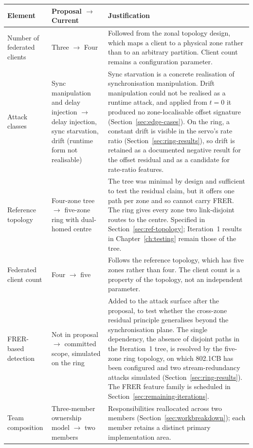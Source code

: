 \begin{longtable}{p{} p{} p{}}
\toprule
\textbf{Element} & \textbf{Proposal $\rightarrow$ Current} & \textbf{Justification} \\
\midrule
\endhead
Number of federated clients & Three $\rightarrow$ Four &
Followed from the zonal topology design, which maps a client to a physical zone
rather than to an arbitrary partition. Client count remains a configuration parameter. \\
\addlinespace
Attack classes & Sync manipulation and delay injection $\rightarrow$ delay injection,
sync starvation, drift (runtime form not realisable) &
Sync starvation is a concrete realisation of synchronisation manipulation. Drift
manipulation could not be realised as a runtime attack, and applied from $t=0$ it
produced no zone-localisable offset signature (Section~\ref{sec:edge-cases}). On the ring, a
constant drift is visible in the servo's rate ratio (Section~\ref{sec:ring-results}), so drift
is retained as a documented negative result for the offset residual and as a candidate for
rate-ratio features. \\
\addlinespace
Reference topology & Four-zone tree $\rightarrow$ five-zone ring with dual-homed
centre &
The tree was minimal by design and sufficient to test the residual claim, but it
offers one path per zone and so cannot carry FRER. The ring gives every zone two
link-disjoint routes to the centre. Specified in Section~\ref{sec:ref-topology}; Iteration~1 results in
Chapter~\ref{ch:testing} remain those of the tree. \\
\addlinespace
Federated client count & Four $\rightarrow$ five &
Follows the reference topology, which has five zones rather than four. The client
count is a property of the topology, not an independent parameter. \\
\addlinespace
FRER-based detection & Not in proposal $\rightarrow$ committed scope, simulated on the ring &
Added to the attack surface after the proposal, to test whether the cross-zone
residual principle generalises beyond the synchronisation plane. The single
dependency, the absence of disjoint paths in the Iteration~1 tree, is resolved by the
five-zone ring topology, on which 802.1CB has been configured and two stream-redundancy
attacks simulated (Section~\ref{sec:ring-results}). The FRER feature family is scheduled in
Section~\ref{sec:remaining-iterations}. \\
\addlinespace
Team composition & Three-member ownership model $\rightarrow$ two members &
Responsibilities reallocated across two members (Section~\ref{sec:workbreakdown}); each member retains a
distinct primary implementation area. \\
\bottomrule
\end{longtable}

